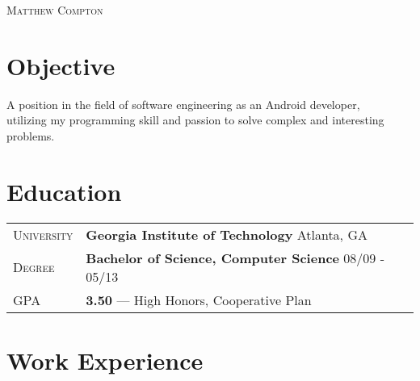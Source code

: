 \documentclass[a4paper, oneside, final]{scrartcl} %
\newcommand{\gray}{\rowcolor[gray]{.90}} %
\begin{document}
\begin{center} %


{\fontsize{36}{36}\selectfont\scshape Matthew Compton} %


\section{Objective}
A position in the field of software engineering as an Android developer,\\
utilizing my programming skill and passion to solve complex and interesting problems.


\section{Education}

\begin{tabularx}{0.97\linewidth}{>{\raggedright\scshape}p{2cm} X}
\gray University & \textbf{Georgia Institute of Technology} \hfill Atlanta, GA\\
\gray Degree & \textbf{Bachelor of Science, Computer Science} \hfill 08/09 - 05/13\\
\gray GPA & \textbf{3.50} --- High Honors, Cooperative Plan\\
\end{tabularx}


\section{Work Experience}


\end{center}
\end{document}
